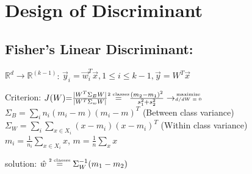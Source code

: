 \section{Design of Discriminant}


\subsection*{Fisher's Linear Discriminant:} 
$\mathbb{R}^d \rightarrow \mathbb{R}^{(k-1)}$: 
$\vec{y}_i = \vec{w}_i^T\vec{x}, 1 \leq i \leq k - 1, \vec{y} = W^T\vec{x}$

{\footnotesize Criterion:} $J(W) {=} \frac{|W^T\Sigma_B W|}{|W^T\Sigma_w W|} {\stackrel{\text{\tiny 2 classes}}{=}} \frac{(m_2 - m_1)^2}{s_1^2 + s_2^2}
\rightarrow \stackrel{\text{\tiny maximize}}{\text{\tiny $d/dW = 0$}}$ \\
$\Sigma_B = \sum_i n_i (m_i-m)(m_i-m)^T$ {\tiny(Between class variance)} \\
$\Sigma_W = \sum_i \sum_{x \in X_i} (x - m_i)(x - m_i)^T$ 
{\tiny(Within class variance)} \\
$m_i = \frac{1}{n_i} \sum_{x \in X_i} x$, $m = \frac{1}{n}\sum_x x$	

solution: $\hat{w} \stackrel{\text{\tiny 2 classes}} {=} \Sigma_W^{-1} (m_1 - m_2)$
